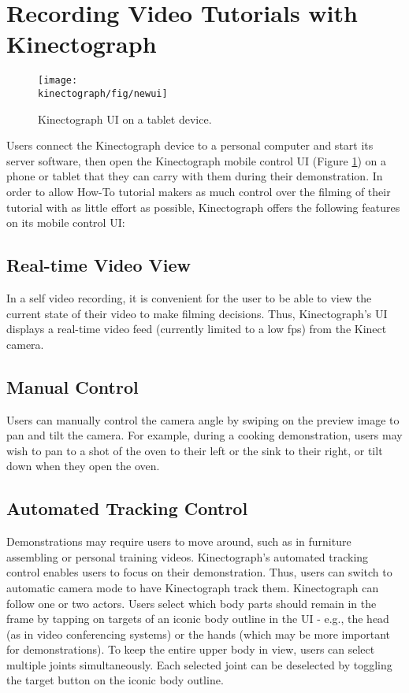 \section{Recording Video Tutorials with Kinectograph}
\label{kinectograph_authoring}

\begin{figure}[t]
\centering
\texttt{[image: \\kinectograph/fig/newui]}
\caption{Kinectograph UI on a tablet device.}
\label{fig:figure4}
\end{figure}

Users connect the Kinectograph device to a personal computer and start its server software, then open the Kinectograph mobile control UI (Figure \ref{fig:figure4}) on a phone or tablet that they can carry with them during their demonstration.
%
In order to allow How-To tutorial makers as much control over the filming of their tutorial with as little effort as possible, Kinectograph offers the following features on its mobile control UI:

\subsection{Real-time Video View}
In a self video recording, it is convenient for the user to be able to view the current state of their video to make filming decisions. Thus, Kinectograph's UI displays a real-time video feed (currently limited to a low fps) from the Kinect camera.

\subsection{Manual Control}
Users can manually control the camera angle by swiping on the preview image to pan and tilt the camera. For example, during a cooking demonstration, users may wish to pan to a shot of the oven to their left or the sink to their right, or tilt down when they open the oven.

\subsection{Automated Tracking Control}
Demonstrations may require users to move around, such as in furniture assembling or personal training videos. Kinectograph's automated tracking control enables users to focus on their demonstration. Thus, users can switch to automatic camera mode to have Kinectograph track them. Kinectograph can follow one or two actors. Users select which body parts should remain in the frame by tapping on targets of an iconic body outline in the UI - e.g., the head (as in video conferencing systems) or the hands (which may be more important for demonstrations). To keep the entire upper body in view, users can select multiple joints simultaneously. Each selected joint can be deselected by toggling the target button on the iconic body outline.

